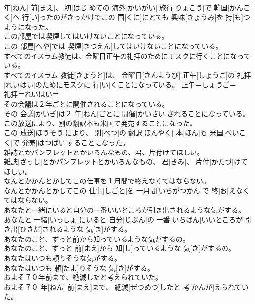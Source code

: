 \documentclass[8pt]{extreport}
\begin{document}
\begin{CJK}{UTF8}{min}
\\	年[ねん] 前[まえ]、 初[はじ]めての 海外[かいがい] 旅行[りょこう]で 韓国[かんこく]へ 行[い]ったのがきっかけでこの 国[くに]にとても 興味[きょうみ]を 持[も]つようになった。	
\\	この部屋では喫煙してはいけないことになっている。	
\\	この 部屋[へや]では 喫煙[きつえん]してはいけないことになっている。	
\\	すべてのイスラム教徒は、金曜日正午の礼拝のためにモスクに行くことになっている。	
\\	すべてのイスラム 教徒[きょうと]は、 金曜日[きんようび] 正午[しょうご]の 礼拝[れいはい]のためにモスクに 行[い]くことになっている。	正午＝しょうご＝ 
\\	礼拝＝れいはい＝ 
\\	その会議は２年ごとに開催されることになっている。	
\\	その 会議[かいぎ]は２ 年[ねん]ごとに 開催[かいさい]されることになっている。	
\\	この放送により、別の翻訳本も米国で発売することになった。	
\\	この 放送[ほうそう]により、 別[べつ]の 翻訳[ほんやく] 本[ほん]も 米国[べいこく]で 発売[はつばい]することになった。	
\\	雑誌とかパンフレットとかいろんなもの、君、片付けてほしい。	
\\	雑誌[ざっし]とかパンフレットとかいろんなもの、 君[きみ]、 片付[かたづ]けてほしい。	
\\	なんとかかんとかしてこの仕事を１月間で終えなくてはならない。	
\\	なんとかかんとかしてこの 仕事[しごと]を 一月間[いちがつかん]で 終[お]えなくてはならない。	
\\	あなたと一緒にいると自分の一番いいところが引き出されるような気がする。	
\\	あなたと 一緒[いっしょ]にいると 自分[じぶん]の 一番[いちばん]いいところが 引き出[ひきだ]されるような 気[き]がする。	
\\	あなたのこと、ずっと前から知っているような気がするの。	
\\	あなたのこと、ずっと 前[まえ]から 知[し]っているような 気[き]がするの。	
\\	あなたはいつも頼りそうな気がする。	
\\	あなたはいつも 頼[たよ]りそうな 気[き]がする。	
\\	およそ７０年前まで、絶滅したと考えられていた。	
\\	およそ７０ 年[ねん] 前[まえ]まで、 絶滅[ぜつめつ]したと 考[かんが]えられていた。	

\end{CJK}
\end{document}
